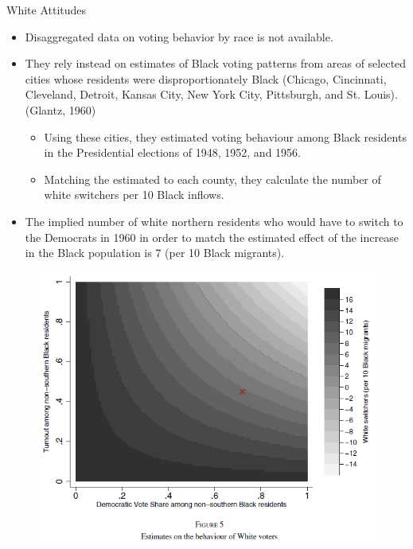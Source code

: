 \documentclass[dvipdfmx,11pt]{beamer}
\begin{document}
\begin{frame}{White Attitudes}
  \begin{itemize}
    \item Disaggregated data on voting behavior by race is not available.
    \item They rely instead on estimates of Black voting patterns from areas of selected cities whose residents were disproportionately Black (Chicago, Cincinnati, Cleveland, Detroit, Kansas City, New York City, Pittsburgh, and St. Louis). (Glantz, 1960)
    \begin{itemize}
      \item Using these cities, they estimated voting behaviour among Black residents in the Presidential elections of 1948, 1952, and 1956.
      \item Matching the estimated to each county, they calculate the number of white switchers per 10 Black inflows.
    \end{itemize}
    \item The implied number of white northern residents who would have to switch to the Democrats in 1960 in order to match the estimated effect of the increase in the Black population is 7 (per 10 Black migrants).
  \end{itemize}
\end{frame}

\begin{frame}{}
  \begin{figure}
    \centering
    \includegraphics[scale = .5]{fig_tab/os20220708/F5.png}
  \end{figure}
\end{frame}
\end{document}

